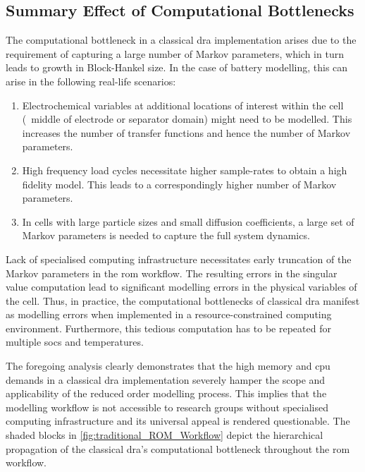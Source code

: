 \subsection{Summary Effect of Computational Bottlenecks}\label{subsec:Summary-Effect-of}

The computational bottleneck in a  classical \gls{dra} implementation arises due
to the  requirement of capturing a  large number of Markov  parameters, which in
turn leads  to growth in  Block-Hankel size. In  the case of  battery modelling,
this can arise in the following real-life scenarios:
\begin{enumerate}
	\item
        Electrochemical variables at additional locations of interest within the
        cell (\eg~middle of electrode or  separator domain) might need  to be
        modelled. This increases the number  of transfer functions and hence the
        number of Markov parameters.
	\item
        High frequency load  cycles necessitate higher sample-rates  to obtain a
        high fidelity  model. This leads  to a correspondingly higher  number of
        Markov parameters.
	\item
        In cells with  large particle sizes and small  diffusion coefficients, a
        large set  of Markov  parameters is  needed to  capture the  full system
        dynamics.
\end{enumerate}
Lack  of  specialised  computing infrastructure  necessitates  early  truncation
of  the  Markov parameters  in  the  \gls{rom}  workflow. The  resulting  errors
in  the singular  value  computation  lead to  significant  modelling errors  in
the  physical  variables of  the  cell.  Thus,  in practice,  the  computational
bottlenecks of classical \gls{dra} manifest as modelling errors when implemented
in  a  resource-constrained  computing environment.  Furthermore,  this  tedious
computation has to be repeated for multiple \glspl{soc} and temperatures.

The foregoing analysis  clearly demonstrates that the high  memory and \gls{cpu}
demands in  a classical \gls{dra}  implementation severely hamper the  scope and
applicability  of the  reduced order  modelling process.  This implies  that the
modelling  workflow is  not accessible  to research  groups without  specialised
computing infrastructure and its universal  appeal is rendered questionable. The
shaded  blocks in  \cref{fig:traditional_ROM_Workflow}  depict the  hierarchical
propagation of the classical \gls{dra}'s computational bottleneck throughout the
\gls{rom} workflow.

